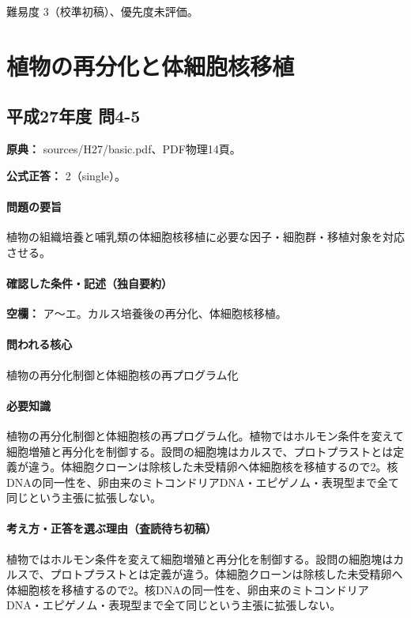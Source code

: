 \par 難易度 3（校準初稿）、優先度未評価。

\section{植物の再分化と体細胞核移植}

\subsection{平成27年度 問4-5}
\label{q:h27-reg-basic-4-5}

\noindent\textbf{原典：} sources/H27/basic.pdf、PDF物理14頁。

\textbf{公式正答：} 2（single）。

\paragraph{問題の要旨} 植物の組織培養と哺乳類の体細胞核移植に必要な因子・細胞群・移植対象を対応させる。

\paragraph{確認した条件・記述（独自要約）}\mbox{}\par

\noindent\textbf{空欄：} ア〜エ。カルス培養後の再分化、体細胞核移植。\par

\paragraph{問われる核心} 植物の再分化制御と体細胞核の再プログラム化

\paragraph{必要知識} 植物の再分化制御と体細胞核の再プログラム化。植物ではホルモン条件を変えて細胞増殖と再分化を制御する。設問の細胞塊はカルスで、プロトプラストとは定義が違う。体細胞クローンは除核した未受精卵へ体細胞核を移植するので2。核DNAの同一性を、卵由来のミトコンドリアDNA・エピゲノム・表現型まで全て同じという主張に拡張しない。

\paragraph{考え方・正答を選ぶ理由（査読待ち初稿）} 植物ではホルモン条件を変えて細胞増殖と再分化を制御する。設問の細胞塊はカルスで、プロトプラストとは定義が違う。体細胞クローンは除核した未受精卵へ体細胞核を移植するので2。核DNAの同一性を、卵由来のミトコンドリアDNA・エピゲノム・表現型まで全て同じという主張に拡張しない。

